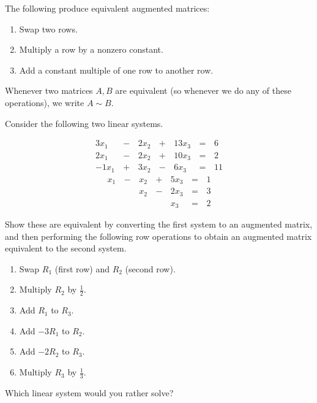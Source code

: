 
\begin{applicationActivities}{2}{4}

\begin{definition}
  The following  produce equivalent
  augmented matrices:
  \begin{enumerate}
    \item Swap two rows.
    \item Multiply a row by a nonzero constant.
    \item Add a constant multiple of one row to another row.
  \end{enumerate}
  Whenever two matrices \(A,B\) are equivalent (so whenever we do any of
  these operations), we write \(A\sim B\).
\end{definition}

\begin{activity}{10}
  Consider the following two linear systems.
  \begin{multicols}{2}\noindent
    \begin{alignat*}{4}
      3x_1 &\,-\,& 2x_2 &\,+\,& 13x_3 &\,=\,& 6 \\
      2x_1 &\,-\,& 2x_2 &\,+\,& 10x_3 &\,=\,& 2 \\
     -1x_1 &\,+\,& 3x_2 &\,-\,&  6x_3 &\,=\,& 11
    \end{alignat*}
    \begin{alignat*}{4}
       x_1 &\,-\,&  x_2  &\,+\,&  5x_3 &\,=\,& 1 \\
           &\, \,&  x_2 &\,-\,&  2x_3 &\,=\,& 3 \\
           &\, \,&      &\, \,&   x_3 &\,=\,& 2
    \end{alignat*}
  \end{multicols}
  \begin{subactivity}
    Show these are equivalent by converting the first system to an augmented
    matrix, and then performing the following row operations to obtain
    an augmented matrix equivalent to the second system.
    \begin{multicols}{2}\noindent
    \begin{enumerate}
      \item Swap \(R_1\) (first row) and \(R_2\) (second row).
      \item Multiply \(R_2\) by \(\frac{1}{2}\).
      \item Add \(R_1\) to \(R_3\).
      \item Add \(-3R_1\) to \(R_2\).
      \item Add \(-2R_2\) to \(R_3\).
      \item Multiply \(R_3\) by \(\frac{1}{3}\).
    \end{enumerate}
    \end{multicols}
  \end{subactivity}
  \begin{subactivity}
    Which linear system would you rather solve?
  \end{subactivity}
\end{activity}


\end{applicationActivities}
